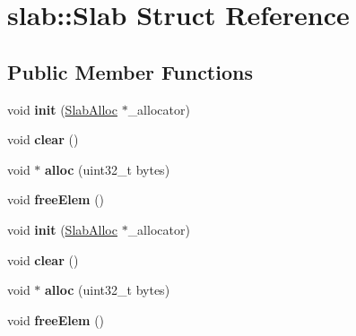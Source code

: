\hypertarget{structslab_1_1Slab}{\section{slab\-:\-:Slab Struct Reference}
\label{structslab_1_1Slab}
}
\subsection*{Public Member Functions}
\begin{DoxyCompactItemize}
\item 
\hypertarget{structslab_1_1Slab_a8f64c1f7cee46ccc745f8df77950b777}{void {\bfseries init} (\hyperlink{classslab_1_1SlabAlloc}{Slab\-Alloc} $\ast$\-\_\-allocator)}\label{structslab_1_1Slab_a8f64c1f7cee46ccc745f8df77950b777}

\item 
\hypertarget{structslab_1_1Slab_ab410f9deef5929bfdfd91ddcf9092b29}{void {\bfseries clear} ()}\label{structslab_1_1Slab_ab410f9deef5929bfdfd91ddcf9092b29}

\item 
\hypertarget{structslab_1_1Slab_a38c4f66a7a28c517cbea420f3a4c2324}{void $\ast$ {\bfseries alloc} (uint32\-\_\-t bytes)}\label{structslab_1_1Slab_a38c4f66a7a28c517cbea420f3a4c2324}

\item 
\hypertarget{structslab_1_1Slab_a2c0214e6118932afa9f3f9c5bf53ccd3}{void {\bfseries free\-Elem} ()}\label{structslab_1_1Slab_a2c0214e6118932afa9f3f9c5bf53ccd3}

\item 
\hypertarget{structslab_1_1Slab_a8f64c1f7cee46ccc745f8df77950b777}{void {\bfseries init} (\hyperlink{classslab_1_1SlabAlloc}{Slab\-Alloc} $\ast$\-\_\-allocator)}\label{structslab_1_1Slab_a8f64c1f7cee46ccc745f8df77950b777}

\item 
\hypertarget{structslab_1_1Slab_ab410f9deef5929bfdfd91ddcf9092b29}{void {\bfseries clear} ()}\label{structslab_1_1Slab_ab410f9deef5929bfdfd91ddcf9092b29}

\item 
\hypertarget{structslab_1_1Slab_a38c4f66a7a28c517cbea420f3a4c2324}{void $\ast$ {\bfseries alloc} (uint32\-\_\-t bytes)}\label{structslab_1_1Slab_a38c4f66a7a28c517cbea420f3a4c2324}

\item 
\hypertarget{structslab_1_1Slab_a2c0214e6118932afa9f3f9c5bf53ccd3}{void {\bfseries free\-Elem} ()}\label{structslab_1_1Slab_a2c0214e6118932afa9f3f9c5bf53ccd3}

\end{DoxyCompactItemize}
